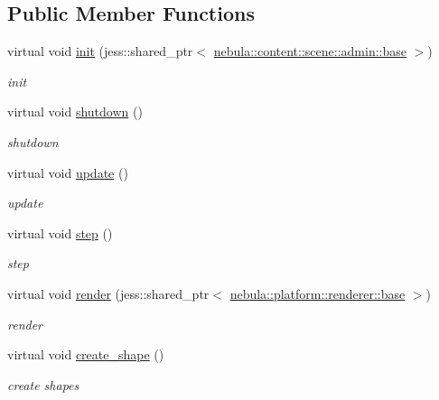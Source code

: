 \subsection*{Public Member Functions}
\begin{DoxyCompactItemize}
\item 
virtual void \hyperlink{classnebula_1_1content_1_1actor_1_1physics_1_1physx_1_1rigid__static__plane_ad61e31b39c4591688b4a7f2cb72b5419}{init} (jess::shared\_\-ptr$<$ \hyperlink{classnebula_1_1content_1_1scene_1_1admin_1_1base}{nebula::content::scene::admin::base} $>$)
\begin{DoxyCompactList}\small\item\em init \item\end{DoxyCompactList}\item 
virtual void \hyperlink{classnebula_1_1content_1_1actor_1_1physics_1_1physx_1_1rigid__static__plane_ac700d7dbdea733b24b1088cc0c78a6a6}{shutdown} ()
\begin{DoxyCompactList}\small\item\em shutdown \item\end{DoxyCompactList}\item 
virtual void \hyperlink{classnebula_1_1content_1_1actor_1_1physics_1_1physx_1_1rigid__static__plane_a1f3ad3d71a0828a841901a7e69cbbe97}{update} ()
\begin{DoxyCompactList}\small\item\em update \item\end{DoxyCompactList}\item 
virtual void \hyperlink{classnebula_1_1content_1_1actor_1_1physics_1_1physx_1_1rigid__static__plane_a8d804808a0611348c62a6478f9faff12}{step} ()
\begin{DoxyCompactList}\small\item\em step \item\end{DoxyCompactList}\item 
virtual void \hyperlink{classnebula_1_1content_1_1actor_1_1physics_1_1physx_1_1rigid__static__plane_a5a8ac2e89cea0594bb1d68fbc038c32a}{render} (jess::shared\_\-ptr$<$ \hyperlink{classnebula_1_1platform_1_1renderer_1_1base}{nebula::platform::renderer::base} $>$)
\begin{DoxyCompactList}\small\item\em render \item\end{DoxyCompactList}\item 
virtual void \hyperlink{classnebula_1_1content_1_1actor_1_1physics_1_1physx_1_1rigid__static__plane_a20338f07330b2d7565d0b75732e68d09}{create\_\-shape} ()
\begin{DoxyCompactList}\small\item\em create shapes \item\end{DoxyCompactList}\end{DoxyCompactItemize}

